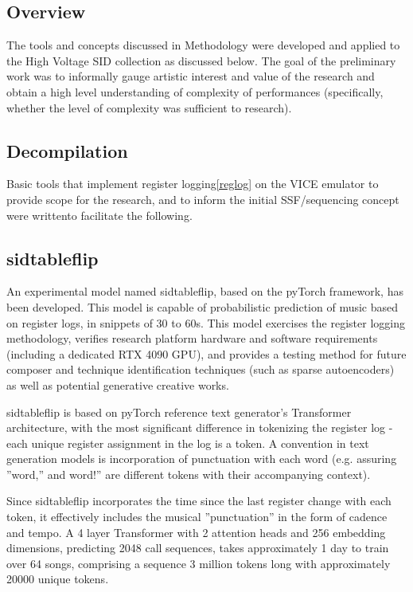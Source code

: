 \documentclass[10pt]{article}
\begin{document}
\begin{multicols*}{2}
\subsection{Overview}

The tools and concepts discussed in Methodology were developed and applied to the High Voltage SID collection as discussed below. The goal of the preliminary work was to informally gauge artistic interest and value of the research and obtain a high level understanding of complexity of performances (specifically, whether the level of complexity was sufficient to research).

\subsection{Decompilation}

Basic tools that implement register logging\ref{reglog} on the VICE emulator\cite{asidvice} to provide scope for the research, and to inform the initial SSF/sequencing concept were writtento facilitate the following.

\subsection{sidtableflip}
\label{sidtableflip}

An experimental model named sidtableflip\cite{sidtableflip}, based on the pyTorch framework, has been developed. This model is capable of probabilistic prediction of music based on register logs, in snippets of 30 to 60s. This model exercises the register logging methodology, verifies research platform hardware and software requirements (including a dedicated RTX 4090 GPU), and provides a testing method for future composer and technique identification techniques (such as sparse autoencoders)  as well as potential generative creative works.

sidtableflip is based on pyTorch reference text generator’s Transformer architecture\cite{pytexample}, with the most significant difference in tokenizing the register log - each unique register assignment in the log is a token. A convention in text generation models is incorporation of punctuation with each word (e.g. assuring ”word,” and word!” are different tokens with their accompanying context).

Since sidtableflip incorporates the time since the last register change with each token, it effectively includes the musical ”punctuation” in the form of cadence and tempo. A 4 layer Transformer with 2 attention heads and 256 embedding dimensions, predicting 2048 call sequences, takes approximately 1 day to train over 64 songs, comprising a sequence 3 million tokens long with approximately 20000 unique tokens.


\end{multicols*}
\end{document}
